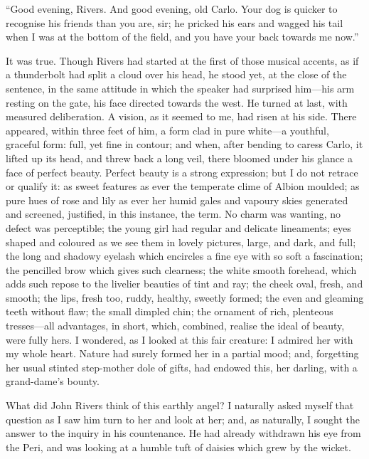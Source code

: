\enquote{Good evening, \Mr{} Rivers. And good evening, old Carlo. Your
	dog is quicker to recognise his friends than you are, sir; he pricked
	his ears and wagged his tail when I was at the bottom of the field, and
	you have your back towards me now.}

It was true. Though \Mr{} Rivers had started at the first of those
musical accents, as if a thunderbolt had split a cloud over his head, he
stood yet, at the close of the sentence, in the same attitude in which
the speaker had surprised him---his arm resting on the gate, his face
directed towards the west. He turned at last, with measured
deliberation. A vision, as it seemed to me, had risen at his side.
There appeared, within three feet of him, a form clad in pure white---a
youthful, graceful form: full, yet fine in contour; and when, after
bending to caress Carlo, it lifted up its head, and threw back a long
veil, there bloomed under his glance a face of perfect beauty. Perfect
beauty is a strong expression; but I do not retrace or qualify it: as
sweet features as ever the temperate clime of Albion moulded; as pure
hues of rose and lily as ever her humid gales and vapoury skies
generated and screened, justified, in this instance, the term. No charm
was wanting, no defect was perceptible; the young girl had regular and
delicate lineaments; eyes shaped and coloured as we see them in lovely
pictures, large, and dark, and full; the long and shadowy eyelash which
encircles a fine eye with so soft a fascination; the pencilled brow
which gives such clearness; the white smooth forehead, which adds such
repose to the livelier beauties of tint and ray; the cheek oval, fresh,
and smooth; the lips, fresh too, ruddy, healthy, sweetly formed; the
even and gleaming teeth without flaw; the small dimpled chin; the
ornament of rich, plenteous tresses---all advantages, in short, which,
combined, realise the ideal of beauty, were fully hers. I wondered, as
I looked at this fair creature: I admired her with my whole heart.
Nature had surely formed her in a partial mood; and, forgetting her
usual stinted step-mother dole of gifts, had endowed this, her darling,
with a grand-dame's bounty.

What did \St{} John Rivers think of this earthly angel? I naturally asked
myself that question as I saw him turn to her and look at her; and, as
naturally, I sought the answer to the inquiry in his countenance. He
had already withdrawn his eye from the Peri, and was looking at a humble
tuft of daisies which grew by the wicket.

